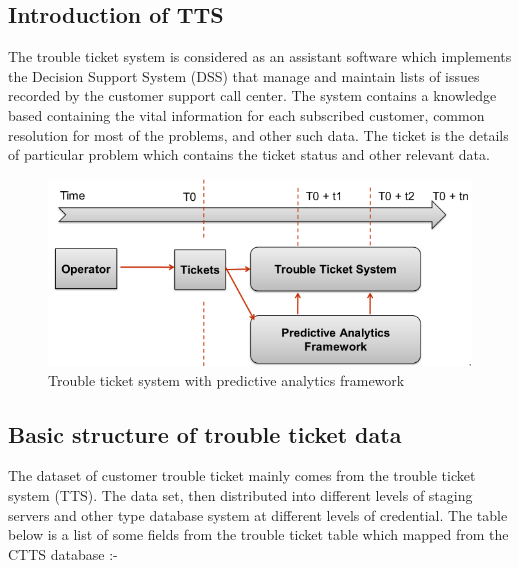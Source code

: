 \documentclass[]{article}
\begin{document}
\subsection{Introduction of TTS}\label{introduction-of-tts}

The trouble ticket system is considered as an assistant software which
implements the Decision Support System (DSS) that manage and maintain
lists of issues recorded by the customer support call center. The system
contains a knowledge based containing the vital information for each
subscribed customer, common resolution for most of the problems, and
other such data. The ticket is the details of particular problem which
contains the ticket status and other relevant data.

\begin{figure}[htbp]
\centering
\includegraphics{tts.png}
\caption{Trouble ticket system with predictive analytics framework}
\end{figure}

\subsection{Basic structure of trouble ticket
data}\label{basic-structure-of-trouble-ticket-data}

The dataset of customer trouble ticket mainly comes from the trouble
ticket system (TTS). The data set, then distributed into different
levels of staging servers and other type database system at different
levels of credential. The table below is a list of some fields from the
trouble ticket table which mapped from the CTTS database :-
\end{document}

